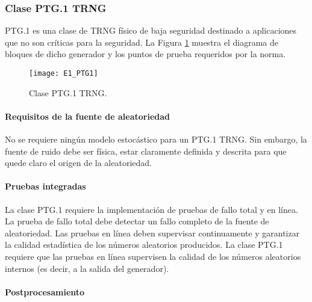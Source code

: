             \subsubsection{Clase PTG.1 TRNG}

                PTG.1 es una clase de TRNG físico de baja seguridad destinado a aplicaciones que no son críticas para la seguridad. La Figura \ref{fig:E1_PTG1} muestra el diagrama de bloques de dicho generador y los puntos de prueba requeridos por la norma.

                \begin{figure}[hbtp]
                    \centering
                    \texttt{[image: E1\_PTG1]}
                    \caption{Clase PTG.1 TRNG.}
                    \label{fig:E1_PTG1}
                \end{figure}

                \paragraph{Requisitos de la fuente de aleatoriedad\\}
                
                No se requiere ningún modelo estocástico para un PTG.1 TRNG. Sin embargo, la fuente de ruido debe ser física, estar claramente definida y descrita para que quede claro el origen de la aleatoriedad.
                
                \paragraph{Pruebas integradas\\}
                
                La clase PTG.1 requiere la implementación de pruebas de fallo total y en línea. La prueba de fallo total debe detectar un fallo completo de la fuente de aleatoriedad. Las pruebas en línea deben supervisar continuamente y garantizar la calidad estadística de los números aleatorios producidos. La clase PTG.1 requiere que las pruebas en línea supervisen la calidad de los números aleatorios internos (es decir, a la salida del generador).
                
                \paragraph{Postprocesamiento\\}
                
